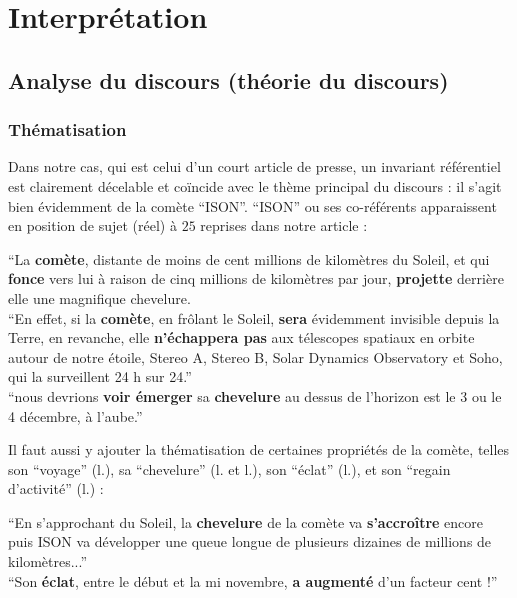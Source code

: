 \documentclass[a4paper,10pt]{article}
\begin{document}
\section{Interprétation}
	\subsection{Analyse du discours (théorie du discours)}
		\subsubsection{Thématisation}
			Dans notre cas, qui est celui d'un court article de presse, un invariant référentiel est clairement décelable et coïncide avec le thème principal du discours : il s'agit bien évidemment de la comète ``ISON''. ``ISON'' ou ses co-référents apparaissent en position de sujet (réel) à $25$ reprises dans notre article :
				\begin{center}
					\footnotesize
					\begin{minipage}{0.7\textwidth}
						``La \textbf{comète}, distante de moins de cent millions de kilomètres du Soleil, et qui \textbf{fonce} vers lui à raison de cinq millions de kilomètres par jour, \textbf{projette} derrière elle une magnifique chevelure.\\
						``En effet, si la \textbf{comète}, en frôlant le Soleil, \textbf{sera} évidemment invisible depuis la Terre, en revanche, elle \textbf{n'échappera pas} aux télescopes spatiaux en orbite autour de notre étoile, Stereo A, Stereo B, Solar Dynamics Observatory et Soho, qui la surveillent 24 h sur 24.''\\
						``nous devrions \textbf{voir émerger} sa \textbf{chevelure} au dessus de l'horizon est le 3 ou le 4 décembre, à l'aube.''
					\end{minipage}
				\end{center}
			Il faut aussi y ajouter la thématisation de certaines propriétés de la comète, telles son ``voyage'' (l.), sa ``chevelure'' (l. et l.), son ``éclat'' (l.), et son ``regain d'activité'' (l.) :
			\begin{center}
				\footnotesize
				\begin{minipage}{0.7\textwidth}
						``En s'approchant du Soleil, la \textbf{chevelure} de la comète va \textbf{s’accroître} encore puis ISON va développer une queue longue de plusieurs dizaines de millions de kilomètres...''\\
						``Son \textbf{éclat}, entre le début et la mi novembre, \textbf{a augmenté} d'un facteur cent !'' 
				\end{minipage}
			\end{center}
\end{document}
